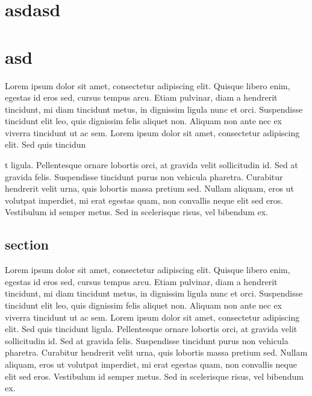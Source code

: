 \chapter{asdasd}
\chapter{asd}
Lorem ipsum dolor sit amet, consectetur adipiscing elit. Quisque libero enim, egestas id eros sed, cursus tempus arcu. Etiam pulvinar, diam a hendrerit tincidunt, mi diam tincidunt metus, in dignissim ligula nunc et orci. Suspendisse tincidunt elit leo, quis dignissim felis aliquet non. Aliquam non ante nec ex viverra tincidunt ut ac sem. Lorem ipsum dolor sit amet, consectetur adipiscing elit. Sed quis tincidun

t ligula. Pellentesque ornare lobortis orci, at gravida velit sollicitudin id. Sed at gravida felis. Suspendisse tincidunt purus non vehicula pharetra. Curabitur hendrerit velit urna, quis lobortis massa pretium sed. Nullam aliquam, eros ut volutpat imperdiet, mi erat egestas quam, non convallis neque elit sed eros. Vestibulum id semper metus. Sed in scelerisque risus, vel bibendum ex.	
\section{section}
Lorem ipsum dolor sit amet, consectetur adipiscing elit. Quisque libero enim, egestas id eros sed, cursus tempus arcu. Etiam pulvinar, diam a hendrerit tincidunt, mi diam tincidunt metus, in dignissim ligula nunc et orci. Suspendisse tincidunt elit leo, quis dignissim felis aliquet non. Aliquam non ante nec ex viverra tincidunt ut ac sem. Lorem ipsum dolor sit amet, consectetur adipiscing elit. Sed quis tincidunt ligula. Pellentesque ornare lobortis orci, at gravida velit sollicitudin id. Sed at gravida felis. Suspendisse tincidunt purus non vehicula pharetra. Curabitur hendrerit velit urna, quis lobortis massa pretium sed. Nullam aliquam, eros ut volutpat imperdiet, mi erat egestas quam, non convallis neque elit sed eros. Vestibulum id semper metus. Sed in scelerisque risus, vel bibendum ex.	
